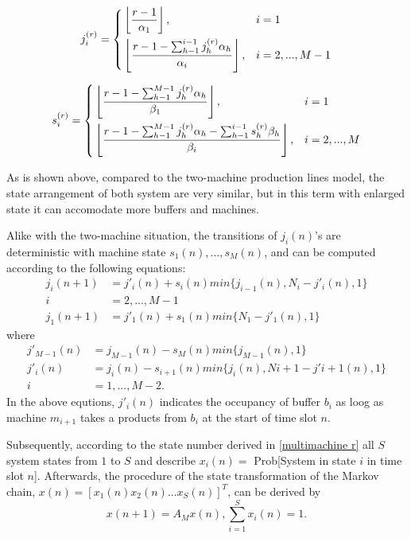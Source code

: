 \begin{equation}
    j^{(r)}_i = \left\{
\begin{aligned}
    &\left\lfloor{\frac{r-1}{\alpha_1}}\right\rfloor, &i&=1 \\ &\left\lfloor{\frac{r-1-\sum^{i-1}_{h-1}j^{(r)}_h\alpha_h}{\alpha_i}}\right\rfloor, &i&=2,...,M-1
\end{aligned}    
\right.
\end{equation}

\begin{equation}
    s_i^{(r)}=\left\{
    \begin{aligned}
        &\left\lfloor{\frac{r-1-\sum^{M-1}_{h-1}j^{(r)}_h\alpha_h}{\beta_1}}\right\rfloor, &i&=1 \\ &\left\lfloor{\frac{r-1-\sum^{M-1}_{h-1}j^{(r)}_h\alpha_h-\sum^{i-1}_{h-1}s^{(r)}_h\beta_h}{\beta_i}}\right\rfloor, &i&=2,...,M
    \end{aligned}\right.
\end{equation}

As is shown above, compared to the two-machine production lines model, the state arrangement of both system are very similar, but in this term with enlarged state it can accomodate more buffers and machines.

Alike with the two-machine situation, the transitions of $j_i(n)$'s are deterministic with machine state $s_1(n),...,s_M(n)$, and can be computed according to the following equations:
\begin{equation}
    \begin{aligned}
      j_i(n + 1) &= j'_i(n) + s_i(n)min\{j_{i-1}(n),N_i - j'_i(n), 1\} \\
      i &= 2, ..., M - 1 \\
      j_1(n + 1) &= j'_1(n) + s_1(n)min\{N_1 - j'_1(n), 1\}
    \end{aligned}
    \end{equation}
    where
    \begin{equation}
      \begin{aligned}
      j'_{M-1}(n)&=j_{M-1}(n) - s_M(n)min\{j_{M-1}(n), 1\} \\
    j'_i(n)&=j_i(n)- s_{i+1}(n)min\{j_i(n),N{i+1}-j'{i+1}(n), 1\} \\
     i &= 1, . . . , M - 2.
    \end{aligned}
    \end{equation}
In the above equtions, $j'_i(n)$ indicates the occupancy of buffer $b_i$ as loog as machine $m_{i+1}$ takes a products  from $b_i$ at the start of time slot $n$.

Subsequently, according to the state number derived in \ref{multimachine r} all $S$ system states from $1$ to $S$ and describe $x_i(n) = $ Prob[System in state $i$ in time slot $n$]. Afterwards, the procedure of the state transformation of the Markov chain, $x(n) = [x_1(n)x_2(n)...x_S(n)]^T$, can be derived by
\begin{equation}
    x(n+1) = A_Mx(n), \sum^S_{i=1}x_i(n) = 1.
\end{equation}

